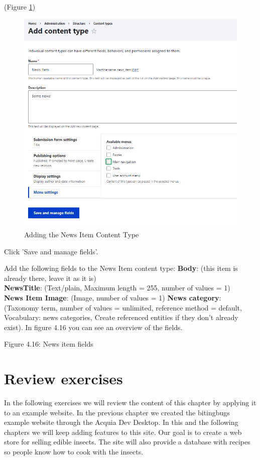 (Figure \ref{fig:contenttype_news_add})


\begin{figure}[H]
    \centering
    \includegraphics[width=1\linewidth]{img/ch4/contenttype_news_add}
    \caption{Adding the News Item Content Type}
    \label{fig:contenttype_news_add}
\end{figure}

Click 'Save and manage fields'.

Add the following fields to the News Item content type: 
\textbf{Body}: (this item is already there, leave it as it is)
\\
\textbf{NewsTitle}: (Text/plain, Maximum length = 255, number of values = 1) 
\\
\textbf{News Item Image}: (Image, number of values = 1)
\textbf{News category}: (Taxonomy term, number of values = unlimited, reference method = default, Vocabulary: news categories, Create referenced entities if they don’t already exist).
In figure 4.16 you can see an overview of the fields.

Figure 4.16: News item fields
\section{Review exercises}
In the following exercises we will review the content of this chapter by applying it to an example website. In the previous chapter we created the bitingbugs example website through the Acquia Dev Desktop. In this and the following chapters we will keep adding features to this site. Our goal is to create a web store for selling edible insects. The site will also provide a database with recipes so people know how to cook with the insects.

